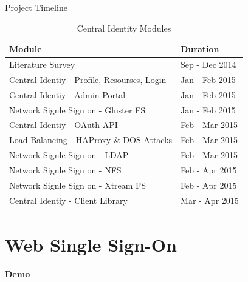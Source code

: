 \documentclass[10pt,xcolor=dvipsnames]{beamer}
\begin{document}
\begin{frame}{Project Timeline}
\begin{table}[H]
		
		\begin{tabular}{ | l | l |}
			\hline 
			\textbf{Module} & \textbf{Duration} \\
			\hline 
			Literature Survey   & Sep - Dec 2014 \\			
			\hline 
			Central Identiy - Profile, Resourses, Login  & Jan - Feb 2015 \\
			\hline
			Central Identiy - Admin Portal & Jan - Feb 2015  \\
			\hline
			Network Signle Sign on  - Gluster FS & Jan - Feb 2015 \\
			\hline
			Central Identiy - OAuth API & Feb - Mar 2015 \\
			\hline
			Load Balancing - HAProxy \& DOS Attacks & Feb - Mar 2015 \\
			\hline
			Network Signle Sign on  - LDAP & Feb - Mar 2015 \\	
			\hline
			Network Signle Sign on  - NFS & Feb - Apr 2015 \\		
			\hline
			Network Signle Sign on  - Xtream FS & Feb - Apr 2015 \\	
			\hline
			Central Identiy - Client Library & Mar - Apr 2015 \\
			\hline 
		\end{tabular}
		\caption{ Central Identity Modules \label{fig:Central Identity Modules}}
	\end{table}
\end{frame}
\section{Web Single Sign-On}

\begin{frame}
\begin{center}
\textbf{Demo}
\end{center}
\end{frame}
\end{document}
